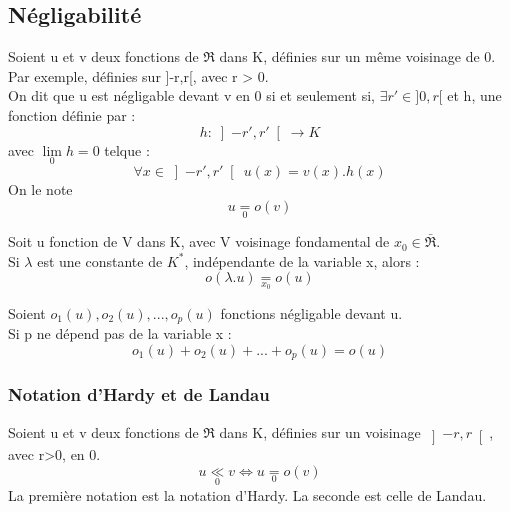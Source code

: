 \subsection{Négligabilité}
\begin{enon}
Soient u et v deux fonctions de $\Re$ dans K, définies sur un même voisinage de 0.\\
Par exemple, définies sur ]-r,r[, avec r > 0.\\
On dit que u est négligable devant v en 0 si et seulement si, $\exists r' \in ]0,r[$ et h, une fonction définie par : 
$$h : \left] -r',r' \right[  \rightarrow K$$
avec $\lim\limits_{0} h = 0$ telque : 
$$\forall x \in \left]-r',r'\right[~ u(x) = v(x).h(x)$$
On le note $$u \underset{0}= o(v)$$
\end{enon}
\begin{prop}
Soit u fonction de V dans K, avec V voisinage fondamental de $x_0 \in \bar{\Re}$.\\
Si $\lambda$ est une constante de $K^*$, indépendante de la variable x, alors :
$$o(\lambda.u) \underset{x_0}= o(u) $$
\end{prop}
\begin{prop}
Soient $o_1(u),o_2(u),...,o_p(u)$ fonctions négligable devant u.\\
Si p ne dépend pas de la variable x :
$$o_1(u)+o_2(u)+...+o_p(u) = o(u)$$
\end{prop}
\subsubsection{Notation d'Hardy et de Landau}
\begin{enon}
Soient u et v deux fonctions de $\Re$ dans K, définies sur un voisinage $\left]-r,r\right[$, avec r>0, en 0.
$$u \underset{0}\ll v \Leftrightarrow u \underset{0}= o(v)$$
La première notation est la notation d'Hardy. La seconde est celle de Landau.
\end{enon}
